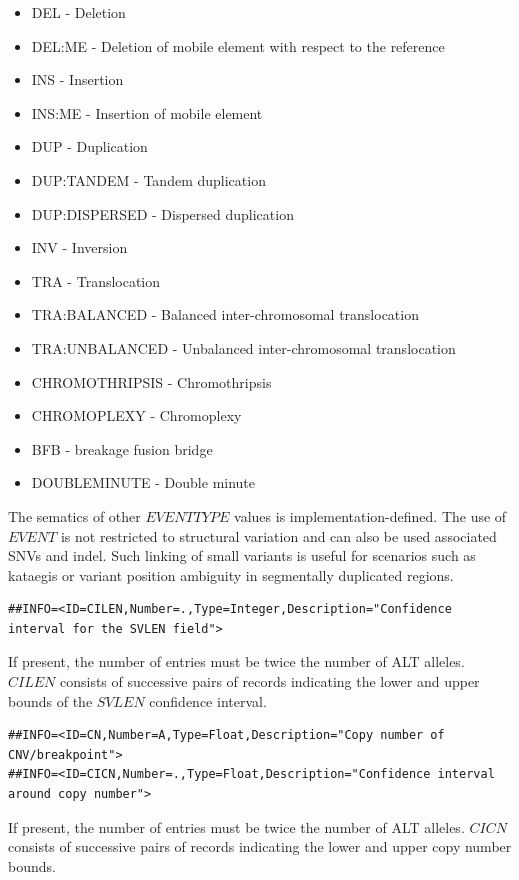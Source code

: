 \documentclass[8pt]{article}
\begin{document}
\begin{itemize}
  \item DEL - Deletion
  \item DEL:ME - Deletion of mobile element with respect to the reference
  \item INS - Insertion
  \item INS:ME - Insertion of mobile element
  \item DUP - Duplication
  \item DUP:TANDEM - Tandem duplication
  \item DUP:DISPERSED - Dispersed duplication
  \item INV - Inversion
  \item TRA - Translocation
  \item TRA:BALANCED - Balanced inter-chromosomal translocation
  \item TRA:UNBALANCED - Unbalanced inter-chromosomal translocation
  \item CHROMOTHRIPSIS - Chromothripsis
  \item CHROMOPLEXY - Chromoplexy
  \item BFB - breakage fusion bridge
  \item DOUBLEMINUTE - Double minute
\end{itemize}
The sematics of other $EVENTTYPE$ values is implementation-defined.
The use of $EVENT$ is not restricted to structural variation and can also be used associated SNVs and indel.
Such linking of small variants is useful for scenarios such as kataegis or variant position ambiguity in segmentally duplicated regions.

\footnotesize
\begin{verbatim}
##INFO=<ID=CILEN,Number=.,Type=Integer,Description="Confidence interval for the SVLEN field">
\end{verbatim}
\normalsize

If present, the number of entries must be twice the number of ALT alleles.
$CILEN$ consists of successive pairs of records indicating the lower and upper bounds of the $SVLEN$ confidence interval.

\footnotesize
\begin{verbatim}
##INFO=<ID=CN,Number=A,Type=Float,Description="Copy number of CNV/breakpoint">
##INFO=<ID=CICN,Number=.,Type=Float,Description="Confidence interval around copy number">
\end{verbatim}
\normalsize

If present, the number of entries must be twice the number of ALT alleles.
$CICN$ consists of successive pairs of records indicating the lower and upper copy number bounds.
\end{document}
